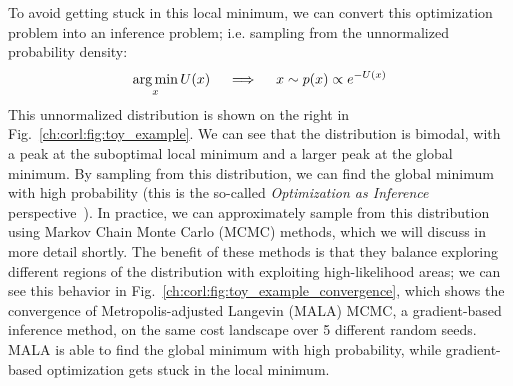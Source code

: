 To avoid getting stuck in this local minimum, we can convert this optimization problem into an inference problem; i.e. sampling from the unnormalized probability density:
\begin{align*}
    \operatorname*{arg\,min}_x U(x) \quad \implies \quad x \sim p(x) \propto e^{-U(x)}
\end{align*}
%
This unnormalized distribution is shown on the right in Fig.~\ref{ch:corl:fig:toy_example}. We can see that the distribution is bimodal, with a peak at the suboptimal local minimum and a larger peak at the global minimum. By sampling from this distribution, we can find the global minimum with high probability (this is the so-called \textit{Optimization as Inference} perspective~\cite{maSamplingCanBe2019,levineReinforcementLearningControl2018a}). In practice, we can approximately sample from this distribution using Markov Chain Monte Carlo (MCMC) methods, which we will discuss in more detail shortly. The benefit of these methods is that they balance exploring different regions of the distribution with exploiting high-likelihood areas; we can see this behavior in Fig.~\ref{ch:corl:fig:toy_example_convergence}, which shows the convergence of Metropolis-adjusted Langevin (MALA) MCMC, a gradient-based inference method, on the same cost landscape over 5 different random seeds. MALA is able to find the global minimum with high probability, while gradient-based optimization gets stuck in the local minimum.

